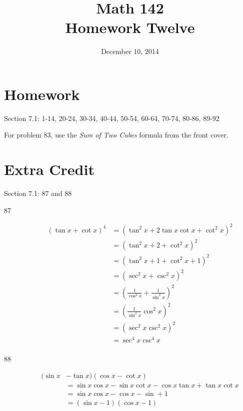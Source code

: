 \documentclass{exam}
\author{}
\date{December 10, 2014}
\title{Math 142 \\ Homework Twelve}
\begin{document}
  \maketitle

  \section{Homework}
  Section 7.1: 1-14, 20-24, 30-34, 40-44, 50-54, 60-64, 70-74, 80-86, 89-92

  For problem 83, use the {\em Sum of Two Cubes} formula from the front cover.

  \section{Extra Credit}
  Section 7.1: 87 and 88

  \ifprintanswers
    \pagebreak
    \begin{description}
      \item[87]
        \begin{align*}
          (\tan x + \cot x)^4 & = \left( \tan^2 x + 2 \tan x \cot x + \cot^2 x \right)^2 \\
                              & = \left( \tan^2 x + 2 + \cot^2 x \right)^2 \\
                              & = \left( \tan^2 x + 1 + \cot^2 x + 1 \right)^2 \\
                              & = \left( \sec^2 x + \csc^2 x \right)^2 \\
                              & = \left( \frac{1}{\cos^2 x} + \frac{1}{\sin^2 x} \right)^2 \\
                              & = \left( \frac{1}{\sin^2 x}{\cos^2 x} \right)^2 \\
                              & = \left( \sec^2 x \csc^2 x \right)^2 \\
                              & = \sec^4 x \csc^4 x \\
        \end{align*}

      \item[88]
        \begin{align*}
          (\sin x &- \tan x)(\cos x - \cot x) \\
		  & = \sin x \cos x - \sin x \cot x - \cos x \tan x + \tan x \cot x \\
                  & = \sin x \cos x - \cos x - \sin + 1 \\
                  & = (\sin x - 1)(\cos x - 1) \\
        \end{align*}

    \end{description}
  \fi
\end{document}
